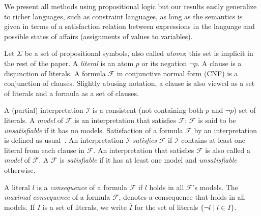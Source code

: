 \documentclass{llncs}
\newcommand\m[1]{\mathcal{#1}}
\newcommand\comment[1]{\marginpar{\tiny #1}}
\renewcommand\comment[1]{#1}
\newcommand{\emilio}[1]{{\comment{\color{red}Emilio: #1}}}
\newcommand{\bart}[1]{{\comment{\color{OliveGreen}Bart: #1}}}
\newcommand\Iend{\ensuremath{I_\mathit{end} }\xspace}
\newcommand\formula{\ensuremath{\m{F} }\xspace}
\newcommand\mm[1]{\ensuremath{#1}\xspace}
\newcommand\voc{\ensuremath{\Sigma}\xspace}
\newcommand\negset[1]{\mm{\overline{#1}}}
\begin{document}
We present all methods using propositional logic but our results easily generalize to richer languages, such as constraint languages, as long as the semantics is given in terms of a satisfaction relation between expressions in the language and possible states of affairs (assignments of values to variables).

Let \voc be a set of propositional symbols, also called \emph{atoms}; this set is implicit in the rest of the paper. A \emph{literal} is an atom $p$ or its negation $\lnot p$. 
A clause is a disjunction of literals. A formula $\formula$ in conjunctive normal form (CNF) is a conjunction of clauses. 
Slightly abusing notation, a clause is also viewed as a set of literals and a formula as a set of clauses. 

A (partial) interpretation $\m{I}$ is a consistent (not containing both $p$ and $\lnot p$) set of literals. 
A \emph{model} of \formula is an interpretation that satisfies \formula; $\formula$ is said to be \emph{unsatisfiable} if it has no models.
Satisfaction of a formula \formula by an interpretation is defined as usual~\cite{faia/2009-185}.
	An interpretation $\m{I}$ \emph{satisfies} \formula if $\m{I}$ contains at least one literal from each clause in $\formula$.
	An interpretation that satisfies $\formula$ is also called a \emph{model} of \formula. 
	A \formula is \emph{satisfiable} if it has at least one model and \emph{unsatisfiable} otherwise. 
	
	A literal $l$ is a \emph{consequence} of a formula \formula if $l$ holds in all $\formula$'s models. The \emph{maximal consequence} of a formula \formula, denotes a consequence that holds in all models.
	If $I$ is a set of literals, we write $\negset{I}$ for the set of literals $\{\lnot l\mid l\in I\}$.
\end{document}
